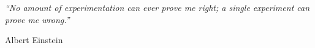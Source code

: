 
\clearpage
\narrowlinespacing
\null\vfill %


\textit{``No amount of experimentation can ever prove me right; a single experiment can prove me
wrong.''}

\begin{flushright}
Albert Einstein
\end{flushright}

\vfill\vfill\vfill\vfill\vfill\vfill\null %
\normallinespacing
